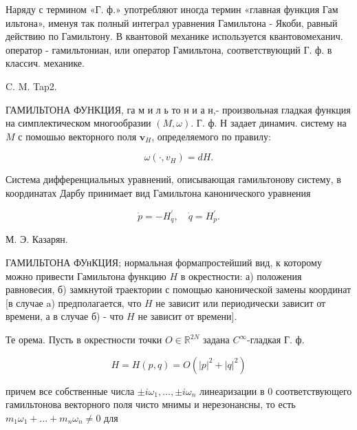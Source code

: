 \documentclass[10pt]{article}
\begin{document}
Наряду с термином «Г. ф.» употребляют иногда термин «главная функция Гам ильтона», именуя так полный интеграл уравнения Гамильтона - Якоби, равный действию по Гамильтону. В квантовой механике используется квантовомеханич. оператор - гамильтониан, или оператор Гамильтона, соответствующий Г. ф. в классич. механике.



C. M. Tap2.



ГАМИЛЬТОНА ФУНКЦИЯ, га м и л ь то н и а н,- произвольная гладкая функция на симплектическом многообразии $(M, \omega)$. Г. ф. Н задает динамич. систему на $M$ с помошью векторного поля $\boldsymbol{v}_{H}$, определяемого по правилу:



\[

\omega\left(\cdot, v_{H}\right)=d H .

\]



Система дифференциальных уравнений, описывающая гамильтонову систему, в координатах Дарбу принимает вид Гамильтона канонического уравнения



\[

\dot{p}=-H_{q}^{\prime}, \quad \dot{q}=H_{p}^{\prime} .

\]



М. Э. Казарян.



ГАМИЛЬТОНА ФУнКЦИЯ; нормальная формапростейший вид, к которому можно привести Гамильтона функцию $H$ в окрестности: а) положения равновесия, б) замкнутой траектории с помощью канонической замены координат [в случае a) предполагается, что $H$ не зависит или периодически зависит от времени, а в случае б) - что $H$ не зависит от времени].



Те орема. Пусть в окрестности точки $O \in \mathbb{R}^{2 N}$ задана $C^{\infty}$-гладкая Г. ф.



\[

H=H(p, q)=O\left(|p|^{2}+|q|^{2}\right)

\]



причем все собственные числа $\pm i \omega_{1}, \ldots, \pm i \omega_{n}$ линеаризации в 0 соответствующего гамильтонова векторного поля чисто мнимы и нерезонансны, то есть $m_{1} \omega_{1}+\ldots+m_{n} \omega_{n} \neq 0$ для
\end{document}
